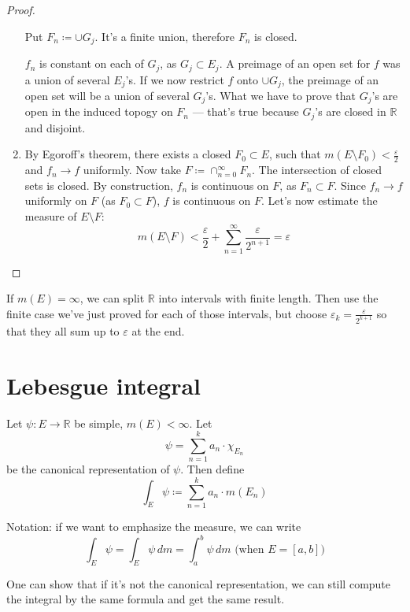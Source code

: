 \begin{proof}
\begin{enumerate}
{            Put $F_n \coloneqq \cup G_j$. It's a finite union, therefore $F_n$ is closed.

            $f_n$ is constant on each of $G_j$, as $G_j \subset E_j$.
            A preimage of an open set for $f$ was a union of several $E_j$'s.
            If we now restrict $f$ onto $\cup G_j$, the preimage of an open set
            will be a union of several $G_j$'s. What we have to prove that 
            $G_j$'s are open in the induced topogy on $F_n$ --- that's 
            true because $G_j$'s are closed in $\mathbb{R}$ and disjoint.
        }
        \item {
            By Egoroff's theorem, there exists a closed $F_0 \subset E$, 
            such that $m(E \setminus F_0) < \frac{\varepsilon}{2}$ and 
            $f_n \to f$ uniformly.
            Now take $F \coloneqq \cap_{n=0}^\infty F_n$. The intersection of closed sets 
            is closed. 
            By construction, $f_n$ is continuous on $F$, as $F_n \subset F$.
            Since $f_n \to f$ uniformly on $F$ (as $F_0 \subset F$),
            $f$ is continuous on $F$.
            Let's now estimate the measure of $E \setminus F$:
            \[
                m(E \setminus F) < \frac{\varepsilon}{2} + 
                \sum_{n=1}^\infty \frac{\varepsilon}{2^{n+1}} = \varepsilon
            \]
        }
    \end{enumerate}
\end{proof}
\begin{remark}
    If $m(E) = \infty$, we can split $\mathbb{R}$ into intervals with finite length.
    Then use the finite case we've just proved for each of those intervals,
    but choose $\varepsilon_k = \frac{\varepsilon}{2^{k + 1}}$ so that they all sum 
    up to $\varepsilon$ at the end.
\end{remark}

\pagebreak
\section{Lebesgue integral}
\begin{definition}
    Let $\psi : E \to \mathbb{R}$ be simple, $m(E) < \infty$. Let
    \[ \psi = \sum_{n=1}^k a_n \cdot \chi_{E_n} \]
    be the canonical representation of $\psi$. Then define
    \[ \int_E \psi \coloneqq \sum_{n=1}^k a_n \cdot m(E_n) \]
\end{definition}
\begin{remark}
    Notation: if we want to emphasize the measure, we can write
    \[ \int_E \psi = \int_E \psi \,dm = \int_a^b \psi \,dm \text{ (when $E=[a, b]$)} \]
\end{remark}
\begin{remark}
    One can show that if it's not the canonical representation,
    we can still compute the integral by the same formula and get the same result.
\end{remark}

